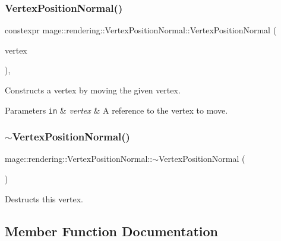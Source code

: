 \subsubsection{\texorpdfstring{Vertex\+Position\+Normal()}{VertexPositionNormal()}\hspace{0.1cm}{\footnotesize\ttfamily [4/4]}}
{\footnotesize\ttfamily constexpr mage\+::rendering\+::\+Vertex\+Position\+Normal\+::\+Vertex\+Position\+Normal (\begin{DoxyParamCaption}\item[{\mbox{\hyperlink{structmage_1_1rendering_1_1_vertex_position_normal}{Vertex\+Position\+Normal}} \&\&}]{vertex }\end{DoxyParamCaption})\hspace{0.3cm}{\ttfamily [default]}, {\ttfamily [noexcept]}}

Constructs a vertex by moving the given vertex.


\begin{DoxyParams}[1]{Parameters}
\mbox{\tt in}  & {\em vertex} & A reference to the vertex to move. \\
\hline
\end{DoxyParams}
\mbox{\label{structmage_1_1rendering_1_1_vertex_position_normal_ac5abfb1132d54581b006cd098f533811}} 
\subsubsection{\texorpdfstring{$\sim$\+Vertex\+Position\+Normal()}{~VertexPositionNormal()}}
{\footnotesize\ttfamily mage\+::rendering\+::\+Vertex\+Position\+Normal\+::$\sim$\+Vertex\+Position\+Normal (\begin{DoxyParamCaption}{ }\end{DoxyParamCaption})\hspace{0.3cm}{\ttfamily [default]}}

Destructs this vertex. 

\subsection{Member Function Documentation}
\mbox{\label{structmage_1_1rendering_1_1_vertex_position_normal_aead42377c86418475bb7b4c93398cd34}} 
